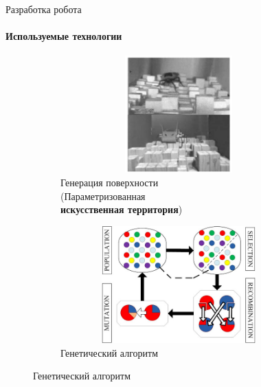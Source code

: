 \documentclass[aspectratio=169,xcolor=table]{beamer}
\begin{document}
\begin{frame}[c]{Разработка робота}
    \framesubtitle{Используемые технологии}
    \vspace{-0.7cm}
    \begin{figure}[H]
        \begin{subfigure}[t]{0.45\textwidth}
            \centering\includegraphics[height=4.5cm,width=1\textwidth,keepaspectratio]{c1_paper.png}
            \caption*{\small Генерация поверхности \\ (Параметризованная \\ \textbf{искусственная территория})}
        \end{subfigure}
        \begin{subfigure}[t]{0.45\textwidth}
            \centering\includegraphics[height=4.5cm,width=1\textwidth,keepaspectratio]{gen_algo.jpg}
            \caption*{ \small Генетический алгоритм}
        \end{subfigure}
        \hfill
    \end{figure}
\end{frame}
\end{document}
